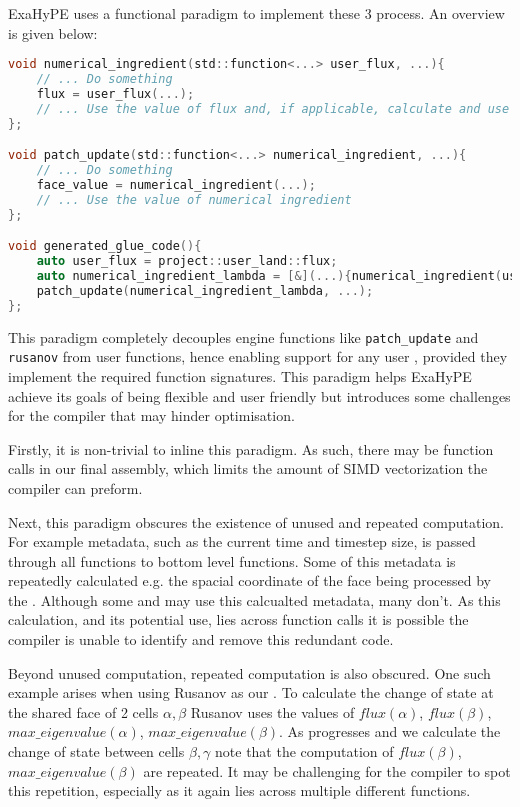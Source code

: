ExaHyPE uses a functional paradigm to implement these 3 process.
An overview is given below:
\begin{lstlisting}[language=c]
void numerical_ingredient(std::function<...> user_flux, ...){
    // ... Do something
    flux = user_flux(...);
    // ... Use the value of flux and, if applicable, calculate and use NCP 
};

void patch_update(std::function<...> numerical_ingredient, ...){
    // ... Do something
    face_value = numerical_ingredient(...);
    // ... Use the value of numerical ingredient
};

void generated_glue_code(){
    auto user_flux = project::user_land::flux;
    auto numerical_ingredient_lambda = [&](...){numerical_ingredient(user_flux, ...)};
    patch_update(numerical_ingredient_lambda, ...);
};
\end{lstlisting}
This paradigm completely decouples engine functions like \lstinline{patch_update} and \lstinline{rusanov} from user functions, hence enabling support for any user , provided they implement the required function signatures.
This paradigm helps ExaHyPE achieve its goals of being flexible and user friendly but introduces some challenges for the compiler that may hinder optimisation.

Firstly, it is non-trivial to inline this paradigm.
As such, there may be function calls in our final assembly, which limits the amount of SIMD vectorization the compiler can preform.

Next, this paradigm obscures the existence of unused and repeated computation.
For example metadata, such as the current time and timestep size, is passed through all functions to bottom level  functions.
Some of this metadata is repeatedly calculated e.g. the spacial coordinate of the face being processed by the .
Although some  and  may use this calcualted metadata, many don't.
As this calculation, and its potential use, lies across function calls it is possible the compiler is unable to identify and remove this redundant code.

Beyond unused computation, repeated computation is also obscured.
One such example arises when using Rusanov as our .
To calculate the change of state at the shared face of 2 cells $\alpha,\beta$ Rusanov uses the values of $flux(\alpha)$, $flux(\beta)$, $max\_eigenvalue(\alpha)$, $max\_eigenvalue(\beta)$.
As  progresses and we calculate the change of state between cells $\beta,\gamma$ note that the computation of $flux(\beta)$, $max\_eigenvalue(\beta)$ are repeated.
It may be challenging for the compiler to spot this repetition, especially as it again lies across multiple different functions.


